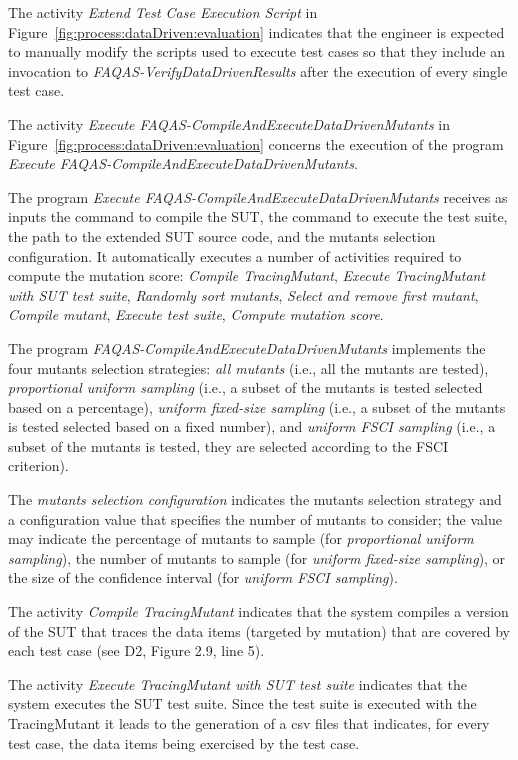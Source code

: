 \RQ{} The activity \emph{Extend Test Case Execution Script} in Figure~\ref{fig:process:dataDriven:evaluation} indicates that the engineer is expected to manually modify the scripts used to execute test cases so that they include an invocation to \emph{FAQAS-VerifyDataDrivenResults} after the execution of every single test case. 

\RQ{} The activity \emph{Execute FAQAS-CompileAndExecuteDataDrivenMutants} in Figure~\ref{fig:process:dataDriven:evaluation} concerns the execution of the program \emph{Execute FAQAS-CompileAndExecuteDataDrivenMutants}.

\RQ{} The program \emph{Execute FAQAS-CompileAndExecuteDataDrivenMutants} receives as inputs the command to compile the SUT, the command to execute the test suite, the path to the extended SUT source code, and the mutants selection configuration. It automatically executes a number of activities required to compute the mutation score: \emph{Compile TracingMutant}, \emph{Execute TracingMutant with SUT test suite}, \emph{Randomly sort mutants}, \emph{Select and remove first mutant}, \emph{Compile mutant}, \emph{Execute test suite},  \emph{Compute mutation score}.

\RQ{} The program \emph{FAQAS-CompileAndExecuteDataDrivenMutants} implements the four mutants selection strategies: \emph{all mutants} (i.e., all the mutants are tested), \emph{proportional uniform sampling} (i.e., a subset of the mutants is tested selected based on a percentage), \emph{uniform fixed-size sampling} (i.e., a subset of the mutants is tested selected based on a fixed number), and \emph{uniform FSCI sampling} (i.e., a subset of the mutants is tested, they are selected according to the FSCI criterion).

\RQ{} The \emph{mutants selection configuration} indicates the mutants selection strategy and a configuration value that specifies the number of mutants to consider; the value may indicate the percentage of mutants to sample (for \emph{proportional uniform sampling}), the number of mutants to sample (for \emph{uniform fixed-size sampling}), or the size of the confidence interval (for \emph{uniform FSCI sampling}).

\RQ{} The activity \emph{Compile TracingMutant} indicates that the system compiles a version of the SUT that traces the data items (targeted by mutation) that are covered by each test case (see D2, Figure 2.9, line 5).

\RQ{} The activity \emph{Execute TracingMutant with SUT test suite} indicates that the system executes the SUT test suite. Since the test suite is executed with the TracingMutant it leads to the generation of a csv files that indicates, for every test case, the data items being exercised by the test case.

